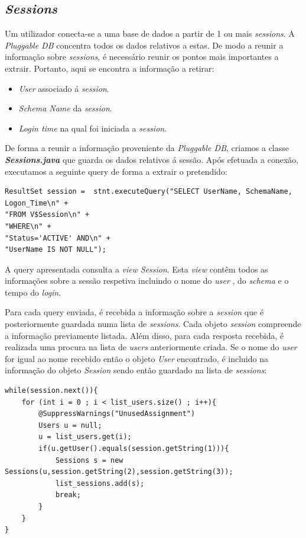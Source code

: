 \subsection*{\textit{Sessions}}
Um utilizador conecta-se a uma base de dados a partir de 1 ou mais \textit{sessions}. A \textit{Pluggable DB} concentra todos os dados relativos a estas. De modo a reunir a informação sobre \textit{sessions}, é necessário reunir os pontos mais importantes a extrair. Portanto, aqui se encontra a informação a retirar:
\begin{itemize}
    \item \textit{User} associado á \textit{session}.
    \item \textit{Schema Name} da \textit{session}.
    \item \textit{Login time} na qual foi iniciada a \textit{session}.
\end{itemize} 
De forma a reunir a informação proveniente da \textit{Pluggable DB}, criamos a classe \textbf{\textit{Sessions.java}} que guarda os dados relativos á sessão. Após efetuada a conexão, executamos a seguinte query de forma a extrair o pretendido:
\vspace{2mm}
\begin{lstlisting}
ResultSet session =  stnt.executeQuery("SELECT UserName, SchemaName, Logon_Time\n" +
"FROM V$Session\n" +
"WHERE\n" +
"Status='ACTIVE' AND\n" +
"UserName IS NOT NULL");

\end{lstlisting}
\vspace{2mm}
A query apresentada consulta a \textit{view} \textit{Session}. Esta \textit{view} contêm todos as informações sobre a sessão respetiva incluindo o nome do \textit{user} , do \textit{schema} e o tempo do \textit{login}.

Para cada query enviada, é recebida a informação sobre a \textit{session} que é posteriormente guardada numa lista de \textit{sessions}. Cada objeto \textit{session} compreende a informação previamente listada. Além disso, para cada resposta recebida, é realizada uma procura na lista de \textit{users} anteriormente criada. Se o nome do \textit{user} for igual ao nome recebido então o objeto \textit{User} encontrado, é incluido na informação do objeto \textit{Session} sendo então guardado na lista de \textit{sessions}:
\vspace{2mm}
\begin{lstlisting}
while(session.next()){
    for (int i = 0 ; i < list_users.size() ; i++){
        @SuppressWarnings("UnusedAssignment")
        Users u = null;
        u = list_users.get(i);
        if(u.getUser().equals(session.getString(1))){
            Sessions s = new Sessions(u,session.getString(2),session.getString(3));
            list_sessions.add(s);
            break;
        }
    }
}
\end{lstlisting}
